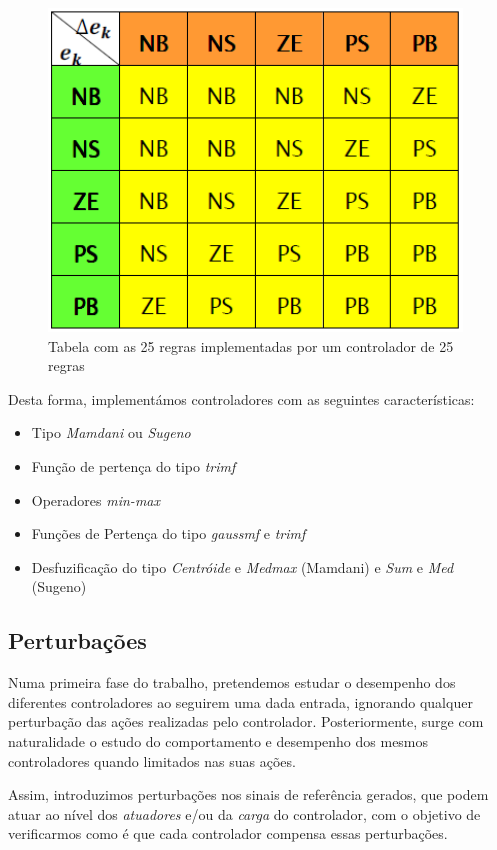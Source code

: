 \documentclass{article}
\begin{document}
\begin{figure}[H]
  \centering
      \includegraphics[scale=0.5]{Images/25_Rules.png}
  \caption{Tabela com as 25 regras implementadas por um controlador de 25 regras}
\end{figure}

Desta forma, implementámos controladores com as seguintes características:

\begin{itemize}
\item Tipo \emph{Mamdani} ou \emph{Sugeno}
\item Função de pertença do tipo \emph{trimf}
\item Operadores \emph{min-max}
\item Funções de Pertença do tipo \emph{gaussmf} e \emph{trimf}
\item Desfuzificação do tipo \emph{Centróide} e \emph{Medmax} (Mamdani) e \emph{Sum} e \emph{Med} (Sugeno)
\end{itemize}

\subsection{Perturbações}

Numa primeira fase do trabalho, pretendemos estudar o desempenho dos diferentes controladores ao seguirem uma dada entrada, ignorando qualquer perturbação das ações realizadas pelo controlador. Posteriormente, surge com naturalidade o estudo do comportamento e desempenho dos mesmos controladores quando limitados nas suas ações.

Assim, introduzimos perturbações nos sinais de referência gerados, que podem atuar ao nível dos \emph{atuadores} e/ou da \emph{carga} do controlador, com o objetivo de verificarmos como é que cada controlador compensa essas perturbações.
\end{document}
